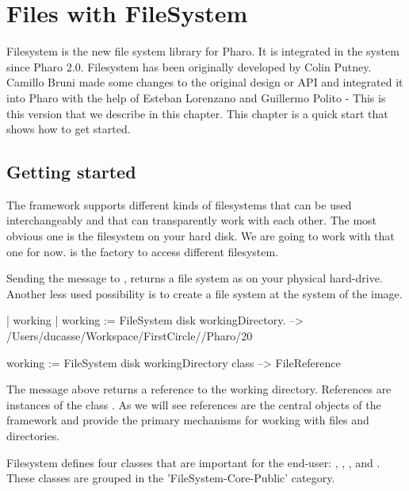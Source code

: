\documentclass[a4paper,10pt,twoside]{book}
\begin{document}
\fi
\sloppy
\chapter{Files with FileSystem }

Filesystem is the new file system library for Pharo. It is integrated in the system since Pharo 2.0. 
Filesystem has been originally developed by Colin Putney. Camillo Bruni made some changes to the original design or API and integrated it into Pharo with the help of Esteban Lorenzano and Guillermo Polito - This is this version that we describe in this chapter. This chapter is a quick start that shows how to get started. 

\section{Getting started}
The framework supports different kinds of filesystems that can be used interchangeably and that can transparently work with each other. The most obvious one is the filesystem on your hard disk. We are going to work with that one for now. 
 is the factory to access different filesystem. 

Sending the message  to , returns a file system as on your physical hard-drive. Another less used possibility is  to create a file system at the system of the image. 

\begin{code}{}
| working |
working := FileSystem disk workingDirectory.
--> /Users/ducasse/Workspace/FirstCircle//Pharo/20

working := FileSystem disk workingDirectory class 
--> FileReference
\end{code} 

The message  above returns a reference to the working directory. References are instances of the class .  As we will see references are the central objects of the framework and provide the primary mechanisms for working with files and directories. 

Filesystem defines four classes that are important for the end-user: , , , and . These classes are grouped in the 'FileSystem-Core-Public' category.
\end{document}
